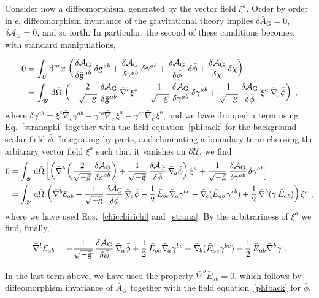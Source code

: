 \documentclass[a4paper,showkeys,aps,prd,reprint,nofootinbib,showpacs,twocolumn]{revtex4-1}
\newcommand{\de}{\mathrm{d}}
\newcommand{\ton}[1]{\left(#1\right)}
\newcommand{\qua}[1]{\left[#1\right]}
\newcommand{\eq}[1]{\( #1 \)}
\newcommand{\eqd}[1]{\begin{equation} #1 \end{equation}}
\newcommand{\speq}[1]{\begin{equation}\begin{split}#1\end{split}\end{equation}}
\newcommand{\Cal}[1]{\mathcal{#1}}
\newcommand{\Scr}[1]{\mathscr{#1}}
\newcommand{\matg}{\text{\textsl{g}}}%
\theoremstyle{plain}
\begin{document}
Consider now a diffeomorphism, generated by the vector field \eq{\xi^a}.  Order by order in \eq{\epsilon}, diffeomorphism invariance of the gravitational theory implies \eq{\delta\bar{A}_{\text{G}} = 0}, \eq{\delta \Cal{A}_{\text{G}} = 0}, and so forth.  In particular, the second of these conditions becomes, with standard manipulations, 
%
\begin{widetext}
%
\speq{0 &= \int_{U} \de^m x \, \ton{\frac{\delta \Cal{A}_{\text{G}}}{\delta \bar{\matg}^{ab}} \, \delta \bar{\matg}^{ab} + \frac{\delta \Cal{A}_{\text{G}}}{\delta \gamma^{ab}} \,\delta \gamma^{ab} + \frac{\delta \Cal{A}_{\text{G}}}{\delta \bar{\phi}} \, \delta \bar{\phi} + \frac{\delta \Cal{A}_{\text{G}}}{\delta \chi} \, \delta \chi} \\
&=\int_{\Scr{U}} \de \bar{\Omega}\, \ton{-\frac{2}{\sqrt{- \bar{\matg}}} \, \frac{\delta  \Cal{A}_{\text{G}}}{\delta \bar{\matg}^{ab}} \, \bar{\nabla}^b \xi^a + \frac{1}{\sqrt{- \bar{\matg}}} \, \frac{\delta \Cal{A}_{\text{G}}}{\delta \gamma^{ab}} \, \delta \gamma^{ab} + \frac{1}{\sqrt{-\bar{\matg}}} \, \frac{\delta \Cal{A}_{\text{G}}}{\delta \bar{\phi}} \, \xi^a \, \bar{\nabla}_{\! a} \bar{\phi}} \;,}
%
where \eq{\delta \gamma^{ab} = \xi^c \bar{\nabla}_{\! c} \gamma^{ab} - \gamma^{cb} \bar{\nabla}_{\! c} \, \xi^a - \gamma^{ac} \bar{\nabla}_{\! c} \, \xi^b}, and we have dropped a term using  Eq.~\eqref{stranaphi} together with the field equation~\eqref{phiback} for the background scalar field \eq{\bar{\phi}}.  Integrating by parts, and eliminating a boundary term choosing the arbitrary vector field \eq{\xi^a} such that it vanishes on \eq{\partial \Scr{U}}, we find
%
\speq{0 &= \int_\Scr{U} \de \bar{\Omega} \qua{\ton{\bar{\nabla}^b \ton{\frac{2}{\sqrt{- \bar{\matg}}} \, \frac{\delta \Cal{A}_{\text{G}}}{\delta \bar{\matg}^{ab}}} + \frac{1}{\sqrt{- \bar{\matg}}} \, \frac{\delta \Cal{A}_{\text{G}}}{\delta \bar{\phi}} \, \bar{\nabla}_{\! a}\bar{\phi} } \xi^a + \frac{1}{\sqrt{- \bar{\matg}}} \, \frac{\delta \Cal{A}_{\text{G}}}{\delta \gamma^{ab}} \, \delta \gamma^{ab}} \\
&= \int_{\Scr{U}} \de \bar{\Omega}\, \ton{\bar{\nabla}^b \Cal{E}_{ab} + \frac{1}{\sqrt{- \bar{\matg}}} \, \frac{\delta \Cal{A}_{\text{G}}}{\delta \bar{\phi}} \, \bar{\nabla}_{\! a}\bar{\phi} - \frac{1}{2} \, \bar{E}_{bc} \bar{\nabla}_{\! a} \gamma^{bc} - \bar{\nabla}_{\! c} (\bar{E}_{ab} \, \gamma^{cb}) + \frac{1}{2}\,\bar{\nabla}^b(\gamma\,\bar{E}_{ab})} \xi^a\;,}
%
where we have used Eqs.~\eqref{chicchirichi} and~\eqref{strana}.  By the arbitrariness of \eq{\xi^a} we find, finally, 
%
\eqd{\bar{\nabla}^b \Cal{E}_{ab} = -\frac{1}{\sqrt{- \bar{\matg}}} \, \frac{\delta \Cal{A}_{\text{G}}}{\delta \bar{\phi}} \, \bar{\nabla}_{\! a} \bar{\phi} + \frac{1}{2} \, \bar{E}_{bc} \bar{\nabla}_{\! a} \gamma^{bc} +  \bar{\nabla}_{\! b} (\bar{E}_{ac} \gamma^{bc})-\frac{1}{2}\,\bar{E}_{ab}\bar{\nabla}^b\gamma\;.
\label{popopoff}}
%
\end{widetext}
In the last term above, we have used the property \eq{\bar{\nabla}^b\bar{E}_{ab}=0}, which follows by diffeomorphism invariance of \eq{\bar{A}_{\text{G}}} together with the field equation~\eqref{phiback} for \eq{\bar{\phi}}.
\end{document}
